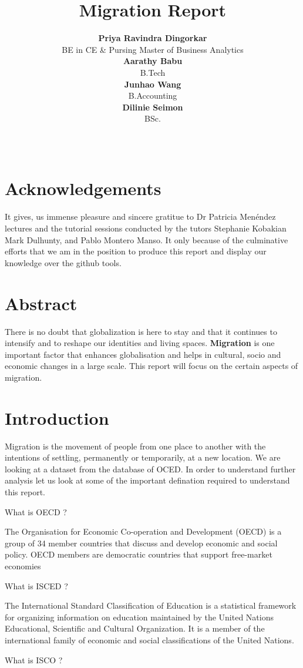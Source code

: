 \documentclass[11pt,a4paper,]{article}
\title{Migration Report}
\author{\sf\Large\textbf{ Priya Ravindra Dingorkar}\\ {\sf\large BE in CE \& Pursing Master of Business Analytics\\[0.5cm]} \sf\Large\textbf{ Aarathy Babu}\\ {\sf\large B.Tech\\[0.5cm]} \sf\Large\textbf{ Junhao Wang}\\ {\sf\large B.Accounting\\[0.5cm]} \sf\Large\textbf{ Dilinie Seimon}\\ {\sf\large BSc.\\[0.5cm]}}
\date{\sf\Date~\Month~\Year}
\makeatletter
\def\titlepage{\front{\expandafter{\@title}}{\@author}{\@organization}}
\makeatother
\begin{document}
\titlepage

\section*{Acknowledgements}

It gives, us immense pleasure and sincere gratitue to Dr Patricia Menéndez lectures and the tutorial sessions conducted by the tutors Stephanie Kobakian Mark Dulhunty, and Pablo Montero Manso. It only because of the culminative efforts that we am in the position to produce this report and display our knowledge over the github tools.

\section*{Abstract}

There is no doubt that globalization is here to stay and that it continues to intensify and to reshape our identities and living spaces. \textbf{Migration} is one important factor that enhances globalisation and helps in cultural, socio and economic changes in a large scale. This report will focus on the certain aspects of migration.

\section*{Introduction}

Migration is the movement of people from one place to another with the intentions of settling, permanently or temporarily, at a new location. We are looking at a dataset from the database of OCED. In order to understand further analysis let us look at some of the important defination required to understand this report.

What is OECD ?

The Organisation for Economic Co-operation and Development (OECD) is a group of 34 member countries that discuss and develop economic and social policy. OECD members are democratic countries that support free-market economies

What is ISCED ?

The International Standard Classification of Education is a statistical framework for organizing information on education maintained by the United Nations Educational, Scientific and Cultural Organization. It is a member of the international family of economic and social classifications of the United Nations.

What is ISCO ?
\end{document}
